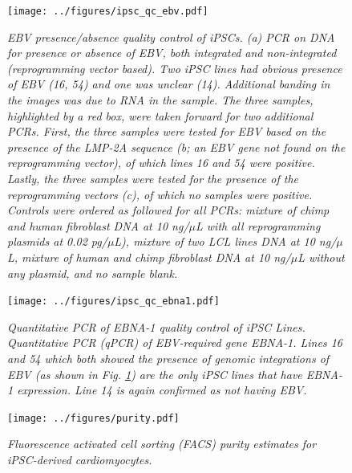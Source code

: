 \documentclass{article}
\begin{document}
\begin{figure}[h]
\begin{center}
    \texttt{[image: ../figures/ipsc\_qc\_ebv.pdf]} 
    \caption{\it{EBV presence/absence quality control of iPSCs. (a) PCR on DNA for presence or absence of EBV, both integrated and non-integrated (reprogramming vector based). Two iPSC lines had obvious presence of EBV (16, 54) and one was unclear (14). Additional banding in the images was due to RNA in the sample. The three samples, highlighted by a red box, were taken forward for two additional PCRs. First, the three samples were tested for EBV based on the presence of the LMP-2A sequence (b; an EBV gene not found on the reprogramming vector), of which lines 16 and 54 were positive. Lastly, the three samples were tested for the presence of the reprogramming vectors (c), of which no samples were positive. Controls were ordered as followed for all PCRs: mixture of chimp and human fibroblast DNA at 10 ng/$\mu$L with all reprogramming plasmids at 0.02 pg/$\mu$L), mixture of two LCL lines DNA at 10 ng/$\mu$L, mixture of human and chimp fibroblast DNA at 10 ng/$\mu$L without any plasmid, and no sample blank.}}
    \label{fig:ipsc_qc_ebv}
    \end{center}
\end{figure}


\begin{figure}[h]
\begin{center}
    \texttt{[image: ../figures/ipsc\_qc\_ebna1.pdf]} 
    \caption{\it{Quantitative PCR of EBNA-1 quality control of iPSC Lines. Quantitative PCR (qPCR) of EBV-required gene EBNA-1. Lines 16 and 54 which both showed the presence of genomic integrations of EBV (as shown in Fig. \ref{fig:ipsc_qc_ebv}) are the only iPSC lines that have EBNA-1 expression. Line 14 is again confirmed as not having EBV.}}
    \label{fig:ipsc_qc_ebna1}
    \end{center}
\end{figure}

\begin{figure}[h]
\begin{center}
    \texttt{[image: ../figures/purity.pdf]} 
    \caption{\it{Fluorescence activated cell sorting (FACS) purity estimates for iPSC-derived cardiomyocytes.}}
    \label{fig:purity}
    \end{center}
\end{figure}
\end{document}
